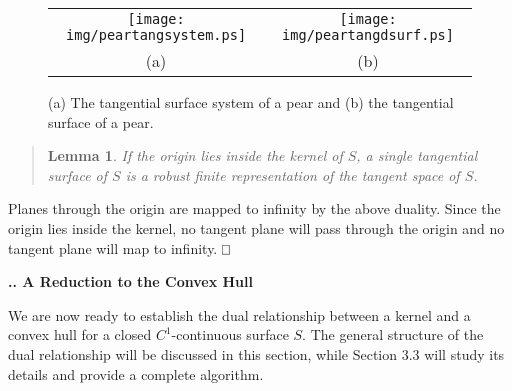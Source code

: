 \documentclass[twoside]{article}
\newtheorem{lemmaenv}{Lemma}
\newenvironment{lemma}{\begin{quote}\begin{lemmaenv}}%
                           {\end{lemmaenv}\end{quote}}
\newcommand{\prf}{\noindent{{\bf Proof}:\ \ \ }}
\newcounter{sectionc}\newcounter{subsectionc}\newcounter{subsubsectionc}
\renewcommand{\subsection}[1] {\vspace{12pt}\addtocounter{subsectionc}{1} 
	\setcounter{subsubsectionc}{0}\noindent 
	{\bf\thesectionc.\thesubsectionc. {\kern1pt \bfit #1}}\par\vspace{5pt}}
\def\qed{\hbox{${\vcenter{\vbox{			%
   \hrule height 0.4pt\hbox{\vrule width 0.4pt height 6pt
   \kern5pt\vrule width 0.4pt}\hrule height 0.4pt}}}$}}
\begin{document}
\begin{figure}[htbp]
\vspace*{14pt}

    \begin{center}
    \begin{tabular}{cc}
    \mbox{\hspace{-0.1in}}
    \texttt{[image: img/peartangsystem.ps]}  & 
    \mbox{\hspace{-0.2in}}
    \texttt{[image: img/peartangdsurf.ps]} \\[-0.0in]
    {(a)}  &  {(b)}
    \end{tabular}
    \end{center}

\caption{(a) The tangential surface system of a pear 
and (b) the tangential surface of a pear.}
\label{fig:peartang}
\end{figure}



\begin{lemma}
\label{lem:drobust}
If the origin lies inside the kernel of $S$,
a single tangential surface of $S$ is a robust finite representation of
the tangent space of $S$.
\end{lemma}
\prf
Planes through the origin are mapped to infinity by the above duality.
Since the origin lies inside the kernel,
no tangent plane will pass through the origin and no tangent plane will map to infinity.
\qed\,



\subsection{A Reduction to the Convex Hull}
\label{sec:reduction}
\noindent
We are now ready to establish the dual relationship between a kernel and a convex hull
for a closed $C^1$-continuous surface $S$.
The general structure of the dual relationship will be discussed in this section,
while Section 3.3 will study its details and provide a complete algorithm.
\end{document}
